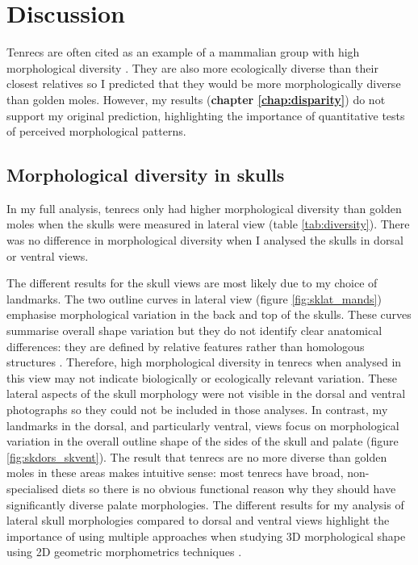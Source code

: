 \chapter{Discussion}
\label{chap:discussion}

\noindent

Tenrecs are often cited as an example of a mammalian group with high morphological diversity \citep{Olson2013, Soarimalala2011, Eisenberg1969}. They are also more ecologically diverse than their closest relatives \citep{Soarimalala2011, Bronner1995} so I predicted that they would be more morphologically diverse than golden moles. However, my results (\textbf{chapter \ref{chap:disparity}}) do not support my original prediction, highlighting the importance of quantitative tests of perceived morphological patterns.

\section{Morphological diversity in skulls}

	In my full analysis, tenrecs only had higher morphological diversity than golden moles when the skulls were measured in lateral view (table \ref{tab:diversity}). There was no difference in morphological diversity when I analysed the skulls in dorsal or ventral views.
	 
	The different results for the skull views are most likely due to my choice of landmarks. The two outline curves in lateral view (figure \ref{fig:sklat_mands}) emphasise morphological variation in the back and top of the skulls. These curves summarise overall shape variation but they do not identify clear anatomical differences: they are defined by relative features rather than homologous structures \citep{Zelditch2012}. Therefore, high morphological diversity in tenrecs when analysed in this view may not indicate biologically or ecologically relevant variation.	
	These lateral aspects of the skull morphology were not visible in the dorsal and ventral photographs so they could not be included in those analyses. In contrast, my landmarks in the dorsal, and particularly ventral, views focus on morphological variation in the overall outline shape of the sides of the skull and palate (figure \ref{fig:skdors_skvent}). The result that tenrecs are no more diverse than golden moles in these areas makes intuitive sense: most tenrecs have broad, non-specialised diets \citep{Olson2013} so there is no obvious functional reason why they should have significantly diverse palate morphologies.
	The different results for my analysis of lateral skull morphologies compared to dorsal and ventral views highlight the importance of using multiple approaches when studying 3D morphological shape using 2D geometric morphometrics techniques \citep{Arnqvist1998}.

